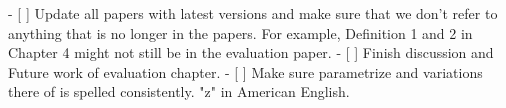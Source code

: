   - [ ] Update all papers with latest versions and make sure that we don't refer to anything that is no longer in the papers. For example, Definition 1 and 2 in Chapter 4 might not still be in the evaluation paper.
  - [ ] Finish discussion and Future work of evaluation chapter.
  - [ ] Make sure parametrize and variations there of is spelled consistently. "z" in American English.